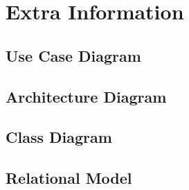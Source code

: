 \chapter{Extra Information}
\section{Use Case Diagram}
\section{Architecture Diagram}
\section{Class Diagram}
\section{Relational Model}